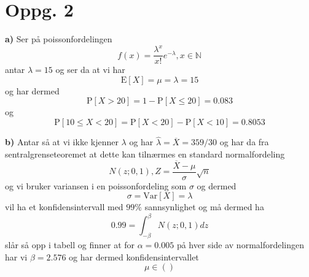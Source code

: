 \documentclass{report}
\newcommand{\M}[2]{\mathbb{#1}^{#2}}
\newcommand{\nbrack}[1]{\left( #1 \right)}
\newcommand{\bbrack}[1]{\left[ #1 \right]}
\newcommand{\Var}[1]{\text{Var} \bbrack{ #1 }}
\newcommand{\std}[1]{\text{E} \bbrack{ #1 }}
\newcommand{\Prob}[1]{\text{P} \bbrack{ #1 }}
\begin{document}
\section*{Oppg. 2}
\textbf{a)}
Ser på poissonfordelingen
\begin{equation}
  \label{eq:6}
  f(x) = \frac{\lambda^{x}}{x!} e^{-\lambda}, x\in \M{N}{}
\end{equation}
antar $\lambda = 15$ og ser da at vi har
\begin{equation}
  \label{eq:7}
  \std{X} = \mu = \lambda = 15
\end{equation}
og har dermed
\begin{equation}
  \label{eq:8}
  \Prob{X>20} = 1 - \Prob{X\leq 20} = 0.083
\end{equation}
og
\begin{equation}
  \label{eq:9}
  \Prob{10\leq X < 20} = \Prob{X<20} - \Prob{X < 10} = 0.8053
\end{equation}

\textbf{b)}
Antar så at vi ikke kjenner $\lambda$ og har $\hat{\lambda} = \overline{X} = 359/30$ og har da fra sentralgrenseteoremet at dette kan tilnærmes en standard normalfordeling
\begin{equation}
  \label{eq:10}
  N(z; 0,1), Z = \frac{\overline{X} - \mu}{\sigma} \sqrt{n}
\end{equation}
og vi bruker variansen i en poissonfordeling som $\sigma$ og dermed
\begin{equation}
  \label{eq:13}
  \sigma = \Var{X} = \lambda
\end{equation}
vil ha et konfidensintervall med $99\%$ sannsynlighet og må dermed ha
\begin{equation}
  \label{eq:11}
  0.99 = \int_{-\beta}^{\beta} N(z; 0, 1) dz
\end{equation}
slår så opp i tabell og finner at for $\alpha = 0.005$ på hver side av normalfordelingen har vi $\beta = 2.576$ og har dermed konfidensintervallet
\begin{equation}
  \label{eq:12}
  \mu \in \nbrack{  }
\end{equation}
\end{document}

